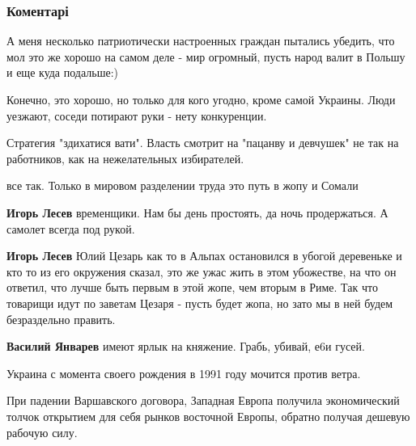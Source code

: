  
 
 
 
 
\subsubsection{Коментарі}
\label{sec:27_04_2019.fb.lesev_igor.1.ldnr_passportizacia.cmt}

\begin{itemize} %

А меня несколько патриотически настроенных граждан пытались убедить, что мол
это же хорошо на самом деле - мир огромный, пусть народ валит в Польшу и еще
куда подальше:)

Конечно, это хорошо, но только для кого угодно, кроме самой Украины. Люди уезжают, соседи потирают руки - нету конкуренции.

Стратегия "здихатися вати". Власть смотрит на "пацанву и девчушек" не так на работников, как на нежелательных избирателей.

\begin{itemize} %
все так. Только в мировом разделении труда это путь в жопу и Сомали

\textbf{Игорь Лесев} временщики. Нам бы день простоять, да ночь продержаться. А самолет всегда под рукой.

\textbf{Игорь Лесев} Юлий Цезарь как то в Альпах остановился в убогой деревеньке и кто то из его окружения сказал, это же ужас жить в этом убожестве, на что он ответил, что лучше быть первым в этой жопе, чем вторым в Риме. Так что товарищи идут по заветам Цезаря - пусть будет жопа, но зато мы в ней будем безраздельно править.

\textbf{Василий Январев} имеют ярлык на княжение. Грабь, убивай, е6и гусей.
\end{itemize} %


Украина с момента своего рождения в 1991 году мочится против ветра.

При падении Варшавского договора, Западная Европа получила экономический толчок
открытием для себя рынков восточной Европы, обратно получая дешевую рабочую
силу.


\end{itemize}
